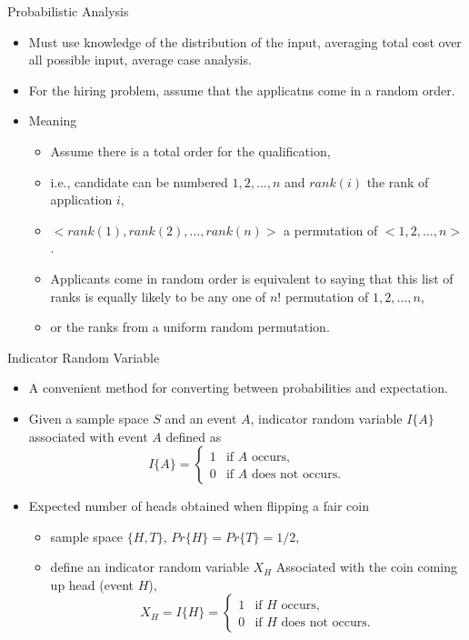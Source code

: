 \documentclass{beamer}
\begin{document}
\begin{frame}{Probabilistic Analysis}

\begin{itemize}
\item Must use knowledge of the distribution of the input, averaging total cost over all possible input, average case analysis. 
\item For the hiring problem, assume that the applicatns come in a random order. 
\item Meaning \begin{itemize}
\item Assume there is a total order for the qualification, 
\item i.e., candidate can be numbered $1, 2, \ldots, n$ and $rank(i)$ the rank of application $i$,
\item $<rank(1),rank(2), \ldots, rank(n)>$ a permutation of $<1,2,\ldots,n>$. 
\item Applicants come in random order is equivalent to saying that this list of ranks is equally likely to be any one of $n!$ permutation of $1,2,\ldots,n$, 
\item or the ranks from a uniform random permutation.
\end{itemize}
\end{itemize}
\end{frame}

\begin{frame}{Indicator Random Variable}

\begin{itemize}
\item A convenient method for converting between probabilities and expectation. 
\item Given a sample space $S$ and an event $A$, indicator random variable $I\{A\}$ associated with event $A$ defined as 
\[
I\{A\} = \left \{ 
\begin{array}{ll} 
1 & \mbox {if $A$ occurs,} \\ 
0 & \mbox {if  $A$ does not occurs.}  
\end{array}
\right.
\]
\item Expected number of heads obtained when flipping a fair coin
\begin{itemize}
\item sample space $\{H,T\}$, $Pr\{H\}=Pr\{T\}=1/2$,
\item define an indicator random variable $X_H$ Associated with the coin coming up head (event $H$),
\[
X_H=I\{H\}=
\left \{ 
\begin{array}{ll} 
1 & \mbox {if $H$ occurs,} \\ 
0 & \mbox {if  $H$ does not occurs.}  
\end{array}
\right.
\]
\end{itemize}
\end{itemize}
\end{frame}
\end{document}
